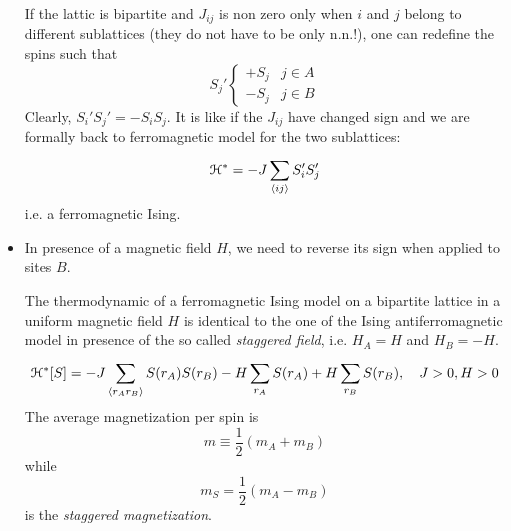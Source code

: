 \documentclass[../main/main.tex]{subfiles}
\begin{document}
\begin{example}
\begin{itemize}
If the lattic is bipartite and \( J_{ij} \) is non zero only when \( i \) and \( j \) belong to different sublattices (they do not have to be only n.n.!), one can redefine the spins such that
\begin{equation}
  S_j' \begin{cases}
    + S_j & j \in A \\
    - S_j & j \in B
\end{cases}
\end{equation}
Clearly, \( S_i'S_j' = - S_i S_j \). It is like if the \( J_{ij} \) have changed sign and we are formally back to ferromagnetic model for the two sublattices:
\begin{equation}
  \mathcal{H}^{*} = - J \sum_{\expval{ij} }^{} S_i' S_j'
\end{equation}
i.e. a ferromagnetic Ising.

\item In presence of a magnetic field \( H \), we need to reverse its sign when applied to sites \( B \).

The thermodynamic of a ferromagnetic Ising model on a bipartite lattice in a uniform magnetic field \( H \) is identical to the one of the Ising antiferromagnetic model in presence of the so called \emph{staggered field}, i.e. \( H_A = H \) and \( H_B = -H \).
\begin{equation}
  \mathcal{H}^* [S] = -J \sum_{\expval{r_A r_B} }^{} S(r_A) S(r_B) - H \sum_{r_A}^{} S(r_A) + H \sum_{r_B}^{} S(r_B), \quad J>0, H>0
\end{equation}
The average magnetization per spin is
\begin{equation}
  m \equiv \frac{1}{2}(m_A+m_B)
\end{equation}
  while
  \begin{equation}
    m_S = \frac{1}{2}(m_A-m_B)
  \end{equation}
  is the \emph{staggered magnetization}.


\end{itemize}
\end{example}
\end{document}
